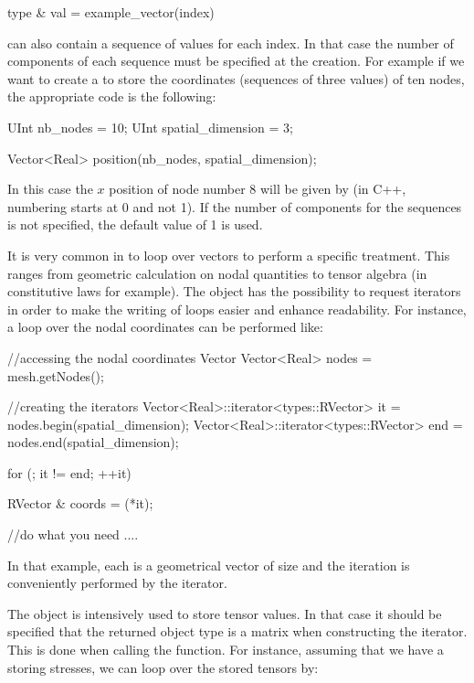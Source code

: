 \begin{cpp}
  type & val = example_vector(index)
\end{cpp}

 can also contain a sequence of values for each
index. In that case the number of components of each sequence must be
specified at the  creation.  For example if we want to
create a  to store the coordinates (sequences of three
values) of ten nodes, the appropriate code is the following:
\begin{cpp}
  UInt nb_nodes = 10;
  UInt spatial_dimension = 3;

  Vector<Real> position(nb_nodes, spatial_dimension);
\end{cpp}
In this case the $x$ position of node number 8 will be given by
 (in C++, numbering starts at 0 and not
1). If the number of components for the sequences is not specified, the
default value of 1 is used.

It is very common in \akantu to loop over vectors to perform a specific
treatment. This ranges from geometric calculation on nodal quantities
to tensor algebra (in constitutive laws for example).
The  object has the possibility to request iterators
in order to make the writing of loops easier and enhance readability.
For instance, a loop over the nodal coordinates can be performed like:
\begin{cpp}
  //accessing the nodal coordinates Vector
  Vector<Real> nodes = mesh.getNodes();

  //creating the iterators
  Vector<Real>::iterator<types::RVector> it  = nodes.begin(spatial_dimension);
  Vector<Real>::iterator<types::RVector> end = nodes.end(spatial_dimension);

  for (; it != end; ++it){
    RVector & coords = (*it);

    //do what you need
    ....

  }
\end{cpp}
In that example, each  is a geometrical vector of size 
and the iteration is conveniently performed by the  iterator.

The  object is intensively used to store tensor values.  In that
case it should be specified that the returned object type is a matrix when
constructing the iterator. This is done when calling the  function. For
instance, assuming that we have a  storing stresses, we can loop
over the stored tensors by:


